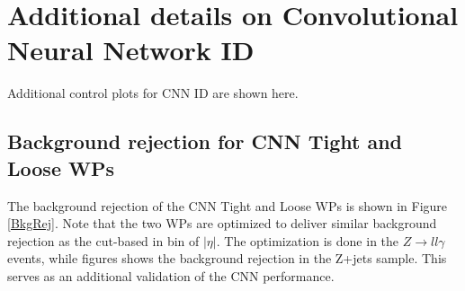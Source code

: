 \chapter{Additional details on Convolutional Neural Network ID}
\label{Adx2}
Additional control plots for CNN ID are shown here.

\section{Background rejection for CNN Tight and Loose WPs}
\label{Adx2:BkgRej}
The background rejection of the CNN Tight and Loose WPs is shown in Figure \ref{BkgRej}. Note that the two WPs are optimized to deliver similar background rejection as the cut-based in bin of $|\eta|$. The optimization is done in the $Z\rightarrow ll\gamma$ events, while figures shows the background rejection in the Z+jets sample. This serves as an additional validation of the CNN performance. 

